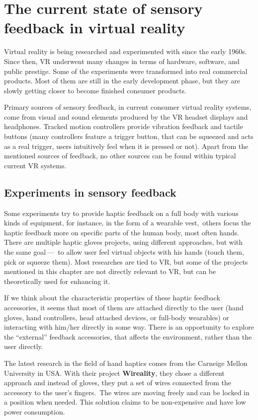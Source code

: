 \chapter{The current state of sensory feedback in virtual reality}\label{currentstate}

Virtual reality is being researched and experimented with since the early 1960s.
\cite{vrhistory} Since then, VR underwent many changes in terms of hardware,
software, and public prestige.
Some of the experiments were transformed into real commercial products.
Most of them are still in the early development phase, but they are slowly getting
closer to become finished consumer products.


Primary sources of sensory feedback, in current consumer virtual reality systems,
come from visual and sound elements produced by the VR headset displays and
headphones. Tracked
motion controllers provide vibration feedback and tactile buttons (many 
controllers feature a trigger button, that can be squeezed and acts as
a real trigger, users intuitively feel when it is pressed or not).
Apart from the mentioned sources of feedback, no other sources can be found
within typical current VR systems.


\section{Experiments in sensory feedback}
Some experiments try to provide haptic feedback on a full body with various
kinds of equipment, for instance, in the form of a wearable vest,\,\cite{tfbhf}
others focus the haptic feedback more on specific parts of the
human body, most often hands.\,\cite{haptgloves} There are multiple haptic gloves 
projects, using different approaches, but with the same goal — 
to allow user feel virtual objects with his hands
(touch them, pick or squeeze them). Most researches are tied to VR,
but some of the projects mentioned in this chapter are not directly relevant
to VR, but can be theoretically used for enhancing it.

If we think about the characteristic properties of these haptic feedback
accessories, it seems that most of them are attached directly to the
user (hand gloves, hand controllers, head attached devices, or full-body wearables)
or interacting with him/her directly in some way. There is an opportunity to explore
the ``external'' feedback accessories, that affects the environment, rather than
the user directly.

The latest research in the field of hand haptics comes from the Carneige Mellon
University in USA. With their project \textbf{Wireality}, they chose a different
approach and instead of gloves, they put a set of wires connected from the
accessory to the user’s fingers.\,\cite{wireality} The wires are moving freely 
and can be locked in a position when needed. This solution claims to be 
non-expensive and have low power consumption. 


